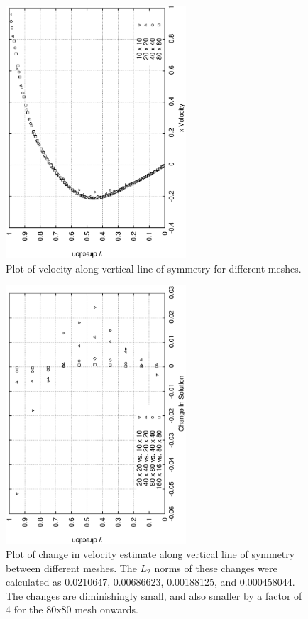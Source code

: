\documentclass[a4paper, 10pt]{article}
\begin{document}
\begin{enumerate}[I]
    \begin{figure}
      \centering
      \includegraphics[width=0.6\textwidth, angle = -90]{../plot/basic/gci/gci.eps}
      \caption{Plot of velocity along vertical line of symmetry for different meshes.}
      \label{Ugci}
    \end{figure}

    \begin{figure}
      \centering
      \includegraphics[width=0.6\textwidth, angle = -90]{../plot/basic/gci/gci2.eps}
      \caption{Plot of change in velocity estimate along vertical line of symmetry between different meshes. The $L_2$ norms of these changes were calculated as 0.0210647, 0.00686623, 0.00188125, and 0.000458044. The changes are diminishingly small, and also smaller by a factor of 4 for the 80x80 mesh onwards.}
      \label{dUgci}
    \end{figure}

\end{enumerate}
%
\end{document}
